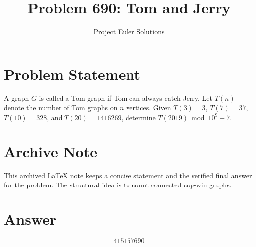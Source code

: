 \documentclass[11pt]{article}
\title{Problem 690: Tom and Jerry}
\author{Project Euler Solutions}
\date{}
\begin{document}
\maketitle

\section{Problem Statement}
A graph $G$ is called a Tom graph if Tom can always catch Jerry. Let $T(n)$ denote the number of Tom graphs on $n$ vertices. Given $T(3)=3$, $T(7)=37$, $T(10)=328$, and $T(20)=1416269$, determine $T(2019) \bmod 10^9+7$.

\section{Archive Note}
This archived LaTeX note keeps a concise statement and the verified final answer for the problem. The structural idea is to count connected cop-win graphs.

\section{Answer}

\[
\boxed{415157690}
\]
\end{document}

